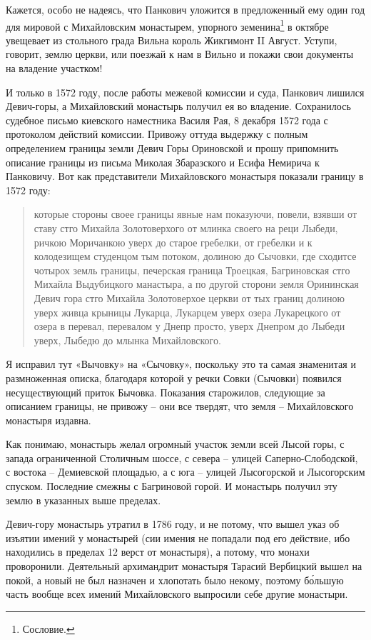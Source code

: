 Кажется, особо не надеясь, что Панкович уложится в предложенный ему один год для мировой с Михайловским монастырем, упорного земенина\footnote{Сословие.} в октябре увещевает из стольного града Вильна король Жикгимонт II Август. Уступи, говорит, землю церкви, или поезжай к нам в Вильно и покажи свои документы на владение участком!

И только в 1572 году, после работы межевой комиссии и суда, Панкович лишился Девич-горы, а Михайловский монастырь получил ея во владение. Сохранилось судебное письмо киевского наместника Василя Рая, 8 декабря 1572 года с протоколом действий комиссии. Привожу оттуда выдержку с полным определением границы земли Девич Горы Ориновской и прошу припомнить описание границы из письма Миколая Збаразского и Есифа Немирича к Панковичу. Вот как представители Михайловского монастыря показали границу в 1572 году\cite{mihdocs}:

\begin{quotation}
которые стороны своее границы явные нам показуючи, повели, взявши от ставу стго Михайла Золотоверхого от млинка своего на реци Лыбеди, ричкою Моричанкою уверх до старое гребелки, от гребелки и к колодезищем студенцом тым потоком, долиною до Сычовки, где сходитсе чотырох земль границы, печерская граница Троецкая, Багриновская стго Михайла Выдубицкого манастыра, а по другой сторони земля Орининская Девич гора стго Михайла Золотоверхое церкви от тых границ долиною уверх живца крыницы Лукарца, Лукарцем уверх озера Лукарецкого от озера в перевал, перевалом у Днепр просто, уверх Днепром до Лыбеди уверх, Лыбедю до млынка Михайловского.
\end{quotation}

Я исправил тут «Вычовку» на «Сычовку», поскольку это та самая знаменитая и размноженная описка, благодаря которой у речки Совки (Сычовки) появился несуществующий приток Бычовка. Показания старожилов, следующие за описанием границы, не привожу – они все твердят, что земля – Михайловского монастыря издавна. 

Как понимаю, монастырь желал огромный участок земли всей Лысой горы, с запада ограниченной Столичным шоссе, с севера – улицей Саперно-Слободской, с востока – Демиевской площадью, а с юга – улицей Лысогорской и Лысогорским спуском. Последние смежны с Багриновой горой. И монастырь получил эту землю в указанных выше пределах.

Девич-гору монастырь утратил в 1786 году, и не потому, что вышел указ об изъятии имений у монастырей (сии имения не попадали под его действие, ибо находились в пределах 12 верст от монастыря), а потому, что монахи проворонили. Деятельный архимандрит монастыря Тарасий Вербицкий вышел на покой, а новый не был назначен и хлопотать было некому, поэтому б\'ольшую часть вообще всех имений Михайловского выпросили себе другие монастыри.

